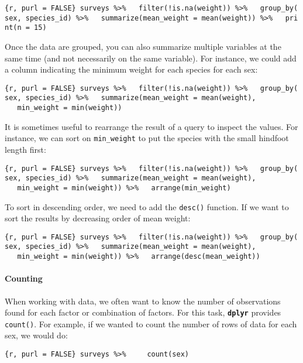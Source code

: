 \documentclass[]{article}
\let\oldparagraph\paragraph
\renewcommand{\paragraph}[1]{\oldparagraph{#1}\mbox{}}
\begin{document}
\texttt{\{r,\ purl\ =\ FALSE\}\ surveys\ \%\textgreater{}\%\ \ \ filter(!is.na(weight))\ \%\textgreater{}\%\ \ \ group\_by(sex,\ species\_id)\ \%\textgreater{}\%\ \ \ summarize(mean\_weight\ =\ mean(weight))\ \%\textgreater{}\%\ \ \ print(n\ =\ 15)}

Once the data are grouped, you can also summarize multiple variables at
the same time (and not necessarily on the same variable). For instance,
we could add a column indicating the minimum weight for each species for
each sex:

\texttt{\{r,\ purl\ =\ FALSE\}\ surveys\ \%\textgreater{}\%\ \ \ filter(!is.na(weight))\ \%\textgreater{}\%\ \ \ group\_by(sex,\ species\_id)\ \%\textgreater{}\%\ \ \ summarize(mean\_weight\ =\ mean(weight),\ \ \ \ \ \ \ \ \ \ \ \ \ min\_weight\ =\ min(weight))}

It is sometimes useful to rearrange the result of a query to inspect the
values. For instance, we can sort on \texttt{min\_weight} to put the
species with the small hindfoot length first:

\texttt{\{r,\ purl\ =\ FALSE\}\ surveys\ \%\textgreater{}\%\ \ \ filter(!is.na(weight))\ \%\textgreater{}\%\ \ \ group\_by(sex,\ species\_id)\ \%\textgreater{}\%\ \ \ summarize(mean\_weight\ =\ mean(weight),\ \ \ \ \ \ \ \ \ \ \ \ \ min\_weight\ =\ min(weight))\ \%\textgreater{}\%\ \ \ arrange(min\_weight)}

To sort in descending order, we need to add the \texttt{desc()}
function. If we want to sort the results by decreasing order of mean
weight:

\texttt{\{r,\ purl\ =\ FALSE\}\ surveys\ \%\textgreater{}\%\ \ \ filter(!is.na(weight))\ \%\textgreater{}\%\ \ \ group\_by(sex,\ species\_id)\ \%\textgreater{}\%\ \ \ summarize(mean\_weight\ =\ mean(weight),\ \ \ \ \ \ \ \ \ \ \ \ \ min\_weight\ =\ min(weight))\ \%\textgreater{}\%\ \ \ arrange(desc(mean\_weight))}

\paragraph{Counting}\label{counting}

When working with data, we often want to know the number of observations
found for each factor or combination of factors. For this task,
\textbf{\texttt{dplyr}} provides \texttt{count()}. For example, if we
wanted to count the number of rows of data for each sex, we would do:

\texttt{\{r,\ purl\ =\ FALSE\}\ surveys\ \%\textgreater{}\%\ \ \ \ \ count(sex)}
\end{document}
